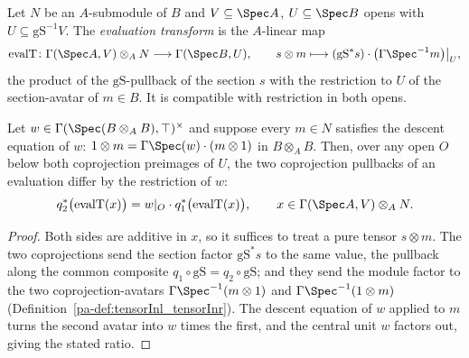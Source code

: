 \begin{definition}
  \label{pa-def:evalT}
  \leanok

  Let \(N\) be an \(A\)-submodule of \(B\) and \(V \subseteq \Spec A\), \(U \subseteq \Spec B\)
  opens with \(U \subseteq \mathrm{gS}^{-1}V\).  The \emph{evaluation transform} is the
  \(A\)-linear map
  \[
    \mathrm{evalT} \colon \Gamma(\Spec A, V) \otimes_A N \longrightarrow \Gamma(\Spec B, U),
    \qquad s \otimes m \longmapsto (\mathrm{gS}^{*} s) \cdot \bigl(\Gamma\Spec^{-1} m\bigr)
    \big|_{U},
  \]
  the product of the \(\mathrm{gS}\)-pullback of the section \(s\) with the restriction to
  \(U\) of the section-avatar of \(m \in B\).  It is compatible with restriction in both opens.
\end{definition}

\begin{lemma}
  \label{pa-lem:evalT_ratio}
  \leanok

  Let \(w \in \Gamma(\Spec(B \otimes_A B), \top)^{\times}\) and suppose every \(m \in N\)
  satisfies the descent equation of \(w\): \(1 \otimes m = \Gamma\Spec(w) \cdot (m \otimes 1)\)
  in \(B \otimes_A B\).  Then, over any open \(O\) below both coprojection preimages of \(U\),
  the two coprojection pullbacks of an evaluation differ by the restriction of \(w\):
  \[
    q_2^{*}\bigl(\mathrm{evalT}(x)\bigr) = w|_{O} \cdot q_1^{*}\bigl(\mathrm{evalT}(x)\bigr),
    \qquad x \in \Gamma(\Spec A, V) \otimes_A N.
  \]
\end{lemma}
\begin{proof}
  \leanok
  Both sides are additive in \(x\), so it suffices to treat a pure tensor \(s \otimes m\).  The
  two coprojections send the section factor \(\mathrm{gS}^{*} s\) to the same value, the
  pullback along the common composite \(q_1 \circ \mathrm{gS} = q_2 \circ \mathrm{gS}\); and
  they send the module factor to the two coprojection-avatars \(\Gamma\Spec^{-1}(m \otimes 1)\)
  and \(\Gamma\Spec^{-1}(1 \otimes m)\) (Definition~\ref{pa-def:tensorInl_tensorInr}).  The descent
  equation of \(w\) applied to \(m\) turns the second avatar into \(w\) times the first, and the
  central unit \(w\) factors out, giving the stated ratio.
\end{proof}

